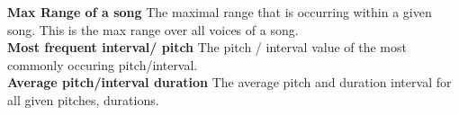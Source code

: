 \noindent \textbf{Max Range of a song} The maximal range that is occurring within a given song. This is the max range over all voices of a song. \\

\noindent \textbf{Most frequent interval/ pitch } The pitch / interval value of the most commonly occuring pitch/interval. \\

\noindent \textbf{Average pitch/interval duration} The average pitch and duration interval for all given pitches, durations. 